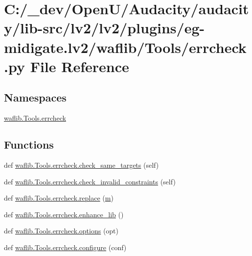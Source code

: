 \hypertarget{lv2_2plugins_2eg-midigate_8lv2_2waflib_2_tools_2errcheck_8py}{}\section{C\+:/\+\_\+dev/\+Open\+U/\+Audacity/audacity/lib-\/src/lv2/lv2/plugins/eg-\/midigate.lv2/waflib/\+Tools/errcheck.py File Reference}
\label{lv2_2plugins_2eg-midigate_8lv2_2waflib_2_tools_2errcheck_8py}
\subsection*{Namespaces}
\begin{DoxyCompactItemize}
\item 
 \hyperlink{namespacewaflib_1_1_tools_1_1errcheck}{waflib.\+Tools.\+errcheck}
\end{DoxyCompactItemize}
\subsection*{Functions}
\begin{DoxyCompactItemize}
\item 
def \hyperlink{namespacewaflib_1_1_tools_1_1errcheck_abfda92de66a72045068f150db1f86e29}{waflib.\+Tools.\+errcheck.\+check\+\_\+same\+\_\+targets} (self)
\item 
def \hyperlink{namespacewaflib_1_1_tools_1_1errcheck_a77b03ce1d3ecfd9295275ce9685d1c80}{waflib.\+Tools.\+errcheck.\+check\+\_\+invalid\+\_\+constraints} (self)
\item 
def \hyperlink{namespacewaflib_1_1_tools_1_1errcheck_a3c373d095646ee41f81dd43ade9e0b63}{waflib.\+Tools.\+errcheck.\+replace} (\hyperlink{layer3_8c_a4b8bfe70f28d6faddcb10d6ecf8c1989}{m})
\item 
def \hyperlink{namespacewaflib_1_1_tools_1_1errcheck_a7752dc841ad9140b7f0dc591120a6a0d}{waflib.\+Tools.\+errcheck.\+enhance\+\_\+lib} ()
\item 
def \hyperlink{namespacewaflib_1_1_tools_1_1errcheck_ac059af9fc4bbe227373b3081aef0221d}{waflib.\+Tools.\+errcheck.\+options} (opt)
\item 
def \hyperlink{namespacewaflib_1_1_tools_1_1errcheck_a8456470882cfc53f245e965934344c2f}{waflib.\+Tools.\+errcheck.\+configure} (conf)
\end{DoxyCompactItemize}
